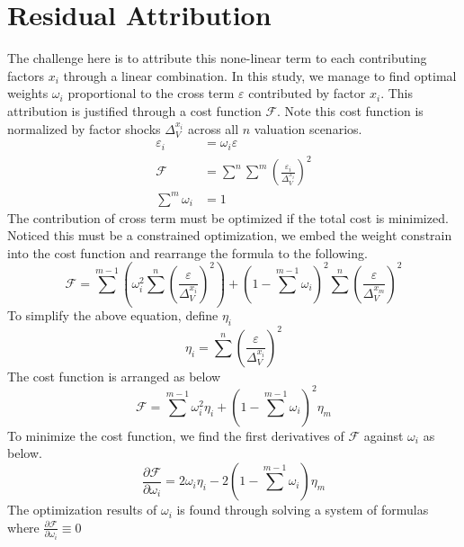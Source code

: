 \documentclass{article}
\begin{document}
\section{Residual Attribution}
The challenge here is to attribute this none-linear term to each contributing factors $ x_i $ through a linear combination. In this study, we manage to find optimal weights $ \omega_i $ proportional to the cross term $ \varepsilon $ contributed by factor $ x_i $. This attribution is justified through a cost function $ \mathcal{F} $. Note this cost function is normalized by factor shocks $ \Delta_{V}^{x_i} $ across all $ n $ valuation scenarios.
\begin{subequations}
    \begin{align}
        \varepsilon_i &= \omega_i \varepsilon \\
        \mathcal{F} &= \sum^n{\sum^m\left(\frac{\varepsilon_i}{\Delta_{V}^{x_i}}\right)^2} \\
        \sum^m{\omega_i} &= 1
    \end{align}
\end{subequations}
The contribution of cross term must be optimized if the total cost is minimized. Noticed this must be a constrained optimization, we embed the weight constrain into the cost function and rearrange the formula to the following.
\begin{equation}
    \mathcal{F} = \sum^{m-1}{\left(\omega_i^2 \sum^n{\left(\frac{\varepsilon}{\Delta_{V}^{x_i}}\right)^2}\right)} + \left(1 - \sum^{m-1}{\omega_i} \right)^2 \sum^n{\left(\frac{\varepsilon}{\Delta_{V}^{x_m}}\right)^2}
\end{equation}
To simplify the above equation, define $ \eta_i $
\begin{equation}
    \eta_i = \sum^n{\left(\frac{\varepsilon}{\Delta_V^{x_i}}\right)^2}
\end{equation}
The cost function is arranged as below
\begin{equation}
    \mathcal{F} = \sum^{m - 1}{\omega_i^2 \eta_i} + \left(1 - \sum^{m - 1}{\omega_i}\right)^2 \eta_m
\end{equation}
To minimize the cost function, we find the first derivatives of $ \mathcal{F} $ against $ \omega_i $ as below.
\begin{equation}
    \frac{\partial \mathcal{F}}{\partial \omega_i} = 2 \omega_i \eta_i - 2 \left(1 - \sum^{m - 1}{\omega_i}\right)\eta_m
\end{equation}
The optimization results of $ \omega_i $ is found through solving a system of formulas where $ \frac{\partial \mathcal{F}}{\partial \omega_i} \equiv 0 $
\end{document}
